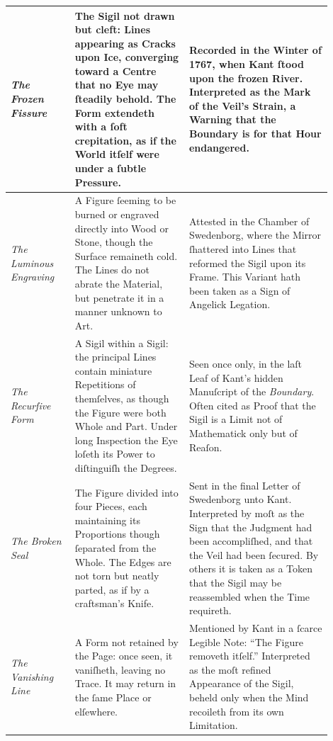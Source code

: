\documentclass[12pt]{article}
\begin{document}
\begin{center}
\begin{tabular}{|p{0.18\linewidth}|p{0.32\linewidth}|p{0.40\linewidth}|}
\textit{The Frozen Fissure} &
The Sigil not drawn but cleft: Lines appearing as Cracks upon Ice, 
converging toward a Centre that no Eye may ſteadily behold. The Form 
extendeth with a ſoft crepitation, as if the World itſelf were under a 
ſubtle Pressure. &
Recorded in the Winter of 1767, when Kant ſtood upon the frozen River. 
Interpreted as the Mark of the Veil’s Strain, a Warning that the Boundary 
is for that Hour endangered. \\
\hline

\textit{The Luminous Engraving} &
A Figure ſeeming to be burned or engraved directly into Wood or Stone, 
though the Surface remaineth cold. The Lines do not abrate the Material, 
but penetrate it in a manner unknown to Art. &
Attested in the Chamber of Swedenborg, where the Mirror ſhattered into 
Lines that reformed the Sigil upon its Frame. This Variant hath been 
taken as a Sign of Angelick Legation. \\
\hline

\textit{The Recurſive Form} &
A Sigil within a Sigil: the principal Lines contain miniature Repetitions 
of themſelves, as though the Figure were both Whole and Part. Under long 
Inspection the Eye loſeth its Power to diſtinguiſh the Degrees. &
Seen once only, in the laſt Leaf of Kant’s hidden Manuſcript of the 
\textit{Boundary}. Often cited as Proof that the Sigil is a Limit not of 
Mathematick only but of Reaſon. \\
\hline

\textit{The Broken Seal} &
The Figure divided into four Pieces, each maintaining its Proportions 
though ſeparated from the Whole. The Edges are not torn but neatly parted, 
as if by a craftsman’s Knife. &
Sent in the final Letter of Swedenborg unto Kant. Interpreted by moſt as 
the Sign that the Judgment had been accompliſhed, and that the Veil had 
been ſecured. By others it is taken as a Token that the Sigil may be 
reassembled when the Time requireth. \\
\hline

\textit{The Vanishing Line} &
A Form not retained by the Page: once seen, it vaniſheth, leaving no 
Trace. It may return in the ſame Place or elſewhere. &
Mentioned by Kant in a ſcarce Legible Note: ``The Figure removeth 
itſelf.'' Interpreted as the moſt refined Appearance of the Sigil, 
beheld only when the Mind recoileth from its own Limitation. \\
\hline

\end{tabular}
\end{center}
\end{document}
